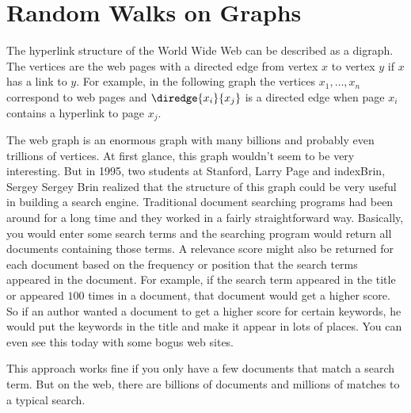 \begin{problems}
\homeworkproblems
{}
\end{problems}


\section{Random Walks on Graphs}\label{Google_sec}

\begin{staffnotes}


\end{staffnotes}

The hyperlink structure of the World Wide Web can be described as a
digraph.  The vertices are the web pages with a directed edge from vertex
$x$ to vertex $y$ if $x$ has a link to $y$.  For example, in the following
graph the vertices $x_1, \ldots, x_n$ correspond to web pages and
$\diredge{x_i}{x_j}$ is a directed edge when page $x_i$ contains a
hyperlink to page $x_j$.


The web graph is an enormous graph with many billions and probably even
trillions of vertices.  At first glance, this graph wouldn't seem to be very
interesting.  But in 1995, two students at Stanford, 
Larry Page and index{Brin, Sergey} Sergey Brin realized that the structure
of this graph could be very useful in building a search engine.
Traditional document searching programs had been around for a long time
and they worked in a fairly straightforward way.  Basically, you would
enter some search terms and the searching program would return all
documents containing those terms.  A relevance score might also be
returned for each document based on the frequency or position that the
search terms appeared in the document.  For example, if the search term
appeared in the title or appeared $100$ times in a document, that document
would get a higher score.  So if an author wanted a document to get a
higher score for certain keywords, he would put the keywords in the title
and make it appear in lots of places.  You can even see this today with
some bogus web sites.

This approach works fine if you only have a few documents that match a
search term.  But on the web, there are billions of documents and millions
of matches to a typical search.

